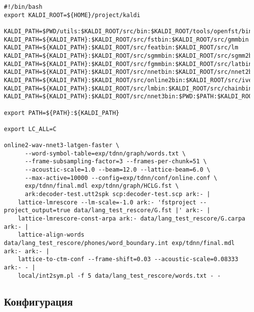 \begin{lstlisting}[caption={Запуск Kaldi},label={kaldi:run},float=h]
#!/bin/bash
export KALDI_ROOT=${HOME}/project/kaldi

KALDI_PATH=$PWD/utils:$KALDI_ROOT/src/bin:$KALDI_ROOT/tools/openfst/bin
KALDI_PATH=${KALDI_PATH}:$KALDI_ROOT/src/fstbin:$KALDI_ROOT/src/gmmbin
KALDI_PATH=${KALDI_PATH}:$KALDI_ROOT/src/featbin:$KALDI_ROOT/src/lm
KALDI_PATH=${KALDI_PATH}:$KALDI_ROOT/src/sgmmbin:$KALDI_ROOT/src/sgmm2bin
KALDI_PATH=${KALDI_PATH}:$KALDI_ROOT/src/fgmmbin:$KALDI_ROOT/src/latbin
KALDI_PATH=${KALDI_PATH}:$KALDI_ROOT/src/nnetbin:$KALDI_ROOT/src/nnet2bin
KALDI_PATH=${KALDI_PATH}:$KALDI_ROOT/src/online2bin:$KALDI_ROOT/src/ivectorbin
KALDI_PATH=${KALDI_PATH}:$KALDI_ROOT/src/lmbin:$KALDI_ROOT/src/chainbin
KALDI_PATH=${KALDI_PATH}:$KALDI_ROOT/src/nnet3bin:$PWD:$PATH:$KALDI_ROOT/tools/sph2pipe_v2.5

export PATH=${PATH}:${KALDI_PATH}

export LC_ALL=C

online2-wav-nnet3-latgen-faster \
      --word-symbol-table=exp/tdnn/graph/words.txt \
      --frame-subsampling-factor=3 --frames-per-chunk=51 \
      --acoustic-scale=1.0 --beam=12.0 --lattice-beam=6.0 \
      --max-active=10000 --config=exp/tdnn/conf/online.conf \
      exp/tdnn/final.mdl exp/tdnn/graph/HCLG.fst \
      ark:decoder-test.utt2spk scp:decoder-test.scp ark:- |
    lattice-lmrescore --lm-scale=-1.0 ark:- 'fstproject --project_output=true data/lang_test_rescore/G.fst |' ark:- |
    lattice-lmrescore-const-arpa ark:- data/lang_test_rescore/G.carpa ark:- |
    lattice-align-words data/lang_test_rescore/phones/word_boundary.int exp/tdnn/final.mdl ark:- ark:- |
    lattice-to-ctm-conf --frame-shift=0.03 --acoustic-scale=0.08333 ark:- - |
    local/int2sym.pl -f 5 data/lang_test_rescore/words.txt - -
\end{lstlisting}

\subsection{Конфигурация}
